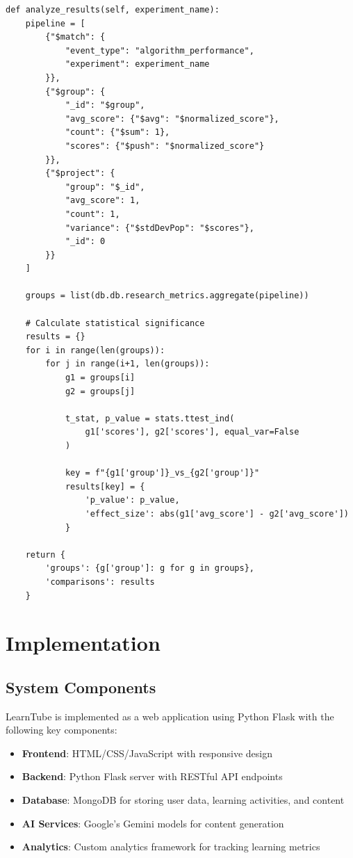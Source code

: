 \documentclass[conference]{IEEEtran}
\begin{document}
\begin{verbatim}
def analyze_results(self, experiment_name):
    pipeline = [
        {"$match": {
            "event_type": "algorithm_performance",
            "experiment": experiment_name
        }},
        {"$group": {
            "_id": "$group",
            "avg_score": {"$avg": "$normalized_score"},
            "count": {"$sum": 1},
            "scores": {"$push": "$normalized_score"}
        }},
        {"$project": {
            "group": "$_id",
            "avg_score": 1,
            "count": 1,
            "variance": {"$stdDevPop": "$scores"},
            "_id": 0
        }}
    ]
    
    groups = list(db.db.research_metrics.aggregate(pipeline))
    
    # Calculate statistical significance
    results = {}
    for i in range(len(groups)):
        for j in range(i+1, len(groups)):
            g1 = groups[i]
            g2 = groups[j]
            
            t_stat, p_value = stats.ttest_ind(
                g1['scores'], g2['scores'], equal_var=False
            )
            
            key = f"{g1['group']}_vs_{g2['group']}"
            results[key] = {
                'p_value': p_value,
                'effect_size': abs(g1['avg_score'] - g2['avg_score'])
            }
    
    return {
        'groups': {g['group']: g for g in groups},
        'comparisons': results
    }
\end{verbatim}

\section{Implementation}
\subsection{System Components}
LearnTube is implemented as a web application using Python Flask with the following key components:

\begin{itemize}
    \item \textbf{Frontend}: HTML/CSS/JavaScript with responsive design
    \item \textbf{Backend}: Python Flask server with RESTful API endpoints
    \item \textbf{Database}: MongoDB for storing user data, learning activities, and content
    \item \textbf{AI Services}: Google's Gemini models for content generation
    \item \textbf{Analytics}: Custom analytics framework for tracking learning metrics
\end{itemize}
\end{document}
